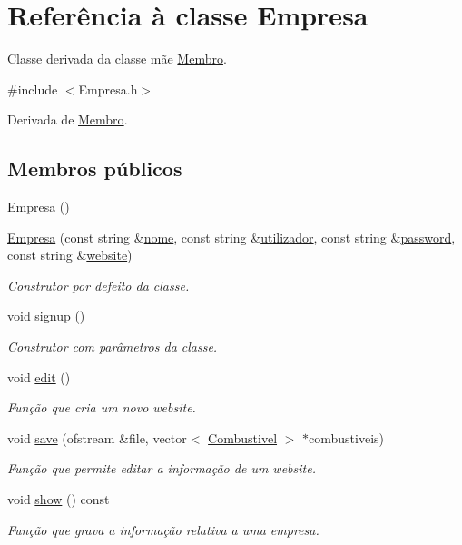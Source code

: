 \hypertarget{class_empresa}{\section{Referência à classe Empresa}
\label{class_empresa}
}


Classe derivada da classe mãe \hyperlink{class_membro}{Membro}.  




{\ttfamily \#include $<$Empresa.\+h$>$}



Derivada de \hyperlink{class_membro}{Membro}.

\subsection*{Membros públicos}
\begin{DoxyCompactItemize}
\item 
\hyperlink{class_empresa_aff124b958356c479ab50ddf4cf302193}{Empresa} ()
\item 
\hyperlink{class_empresa_a8d57f5422b13a48395f63d82a51bede5}{Empresa} (const string \&\hyperlink{class_membro_a2598bbe34ae32a98f41468b2202a9555}{nome}, const string \&\hyperlink{class_membro_a42cc733ff94ec8d1bbfdacc62dfbb0e7}{utilizador}, const string \&\hyperlink{class_membro_ae2b12fc3e91efc674c07e735edf4ac21}{password}, const string \&\hyperlink{class_empresa_a809624b98d1db18f8627ce2fa394dddd}{website})
\begin{DoxyCompactList}\small\item\em Construtor por defeito da classe. \end{DoxyCompactList}\item 
void \hyperlink{class_empresa_a93293b79b5b56973c3a3d3880d325c14}{signup} ()
\begin{DoxyCompactList}\small\item\em Construtor com parâmetros da classe. \end{DoxyCompactList}\item 
void \hyperlink{class_empresa_a97feeb44a837e086f7aa92f8c9a1ea10}{edit} ()
\begin{DoxyCompactList}\small\item\em Função que cria um novo website. \end{DoxyCompactList}\item 
void \hyperlink{class_empresa_a508c9c178a2933255eadc7955d3f8089}{save} (ofstream \&file, vector$<$ \hyperlink{class_combustivel}{Combustivel} $>$ $\ast$combustiveis)
\begin{DoxyCompactList}\small\item\em Função que permite editar a informação de um website. \end{DoxyCompactList}\item 
void \hyperlink{class_empresa_a707dc497843f63a2d094fb6871fa5b7d}{show} () const 
\begin{DoxyCompactList}\small\item\em Função que grava a informação relativa a uma empresa. \end{DoxyCompactList}\end{DoxyCompactItemize}
